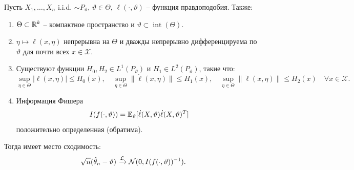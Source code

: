 \begin{thm} \label{Asymptotic efficiency ML estimators}
	Пусть $X_1, \dots, X_n$ i.i.d. $\sim P_\vartheta$, $\vartheta \in \Theta$, $\ell(\cdot, \vartheta)$ -- функция правдоподобия. Также:
	\begin{enumerate}
		\item $\Theta \subset \mathbb{R}^k$ -- компактное пространство и $\vartheta \subset \operatorname{int}(\Theta)$.
		\item $\eta \mapsto \ell(x, \eta) $ непрерывна на $\Theta$ и дважды непрерывно дифференцируема по $\vartheta$ для почти всех $x \in \mathcal{X}$.
		\item Существуют функции $H_0, H_2 \in L^1(P_\vartheta)$ и $H_1 \in L^2(P_\vartheta)$, такие что:
		\[ \sup_{\eta \in \Theta} |\ell(x, \eta)| \leq H_0(x), \quad \sup_{\eta \in \Theta} \|\dot{\ell}(x, \eta)\| \leq H_1(x), \quad \sup_{\eta \in \Theta} \|\ddot{\ell}(x, \eta)\| \leq H_2(x) \quad \forall x \in \mathcal{X}. \]
		\item Информация Фишера
		\[ I(f(\cdot, \vartheta))=\mathbb{E}_\vartheta[\dot{\ell}(X,\vartheta)\dot{\ell}(X,\vartheta)^T] \]
		положительно определенная (обратима).
	\end{enumerate}
	Тогда имеет место сходимость:
	\[ \sqrt{n}(\hat{\theta}_n-\vartheta) \xrightarrow{\mathcal{L}} \mathcal{N}(0, I(f(\cdot, \vartheta))^{-1}). \]
\end{thm}
